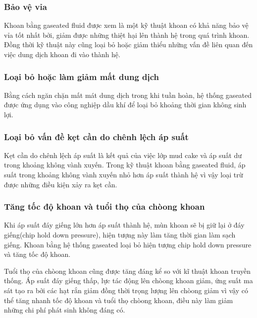 \documentclass[13pt,a4paper]{article}
\begin{document}
	\subsubsection{Bảo vệ vỉa}
	Khoan bằng gaseated fluid được xem là một kỹ thuật khoan có khả năng bảo vệ vỉa tốt nhất bởi, giảm được những thiệt hại lên thành hệ trong quá trình khoan. Đồng thời kỹ thuật này cũng loại bỏ hoặc giảm thiểu những vấn đề liên quan đến việc dung dịch khoan đi vào thành hệ. 
	\subsubsection{Loại bỏ hoặc làm giảm mất dung dịch}
	Bằng cách ngăn chặn mất mát dung dịch trong khi tuần hoàn, hệ thống gaseated được ứng dụng vào công nghiệp dầu khí để loại bỏ khoảng thời gian không sinh lợi.
	\subsubsection{Loại bỏ vấn đề kẹt cần do chênh lệch áp suất}
	Kẹt cần do chênh lệch áp suất là kết quả của việc lớp mud cake và áp suất dư trong khoảng không vành xuyến. Trong kỹ thuật khoan bằng gaseated fluid, áp suất trong khoảng không vành xuyến nhỏ hơn áp suất thành hệ vì vậy loại trừ được những điều kiện xảy ra kẹt cần.
	\subsubsection{Tăng tốc độ khoan và tuổi thọ của chòong khoan}
	Khi áp suất đáy giếng lớn hơn áp suất thành hệ, mùn khoan sẽ bị giữ lại ở đáy giếng(chip hold down pressure), hiện tượng này làm tăng thời gian làm sạch giếng. Khoan bằng hệ thống gaseated loại bỏ hiện tượng chip hold down pressure và tăng tốc độ khoan.\par
	Tuổi thọ của chòong khoan cũng được tăng đáng kể so với kĩ thuật khoan truyền thống. Áp suất đáy giếng thấp, lực tác động lên chòong khoan giảm, ứng suất ma sát tạo ra bởi các hạt rắn giảm đồng thời trọng lượng lên chòong giảm vì vậy có thể tăng nhanh tốc độ khoan và tuổi thọ chòong khoan, điều này làm giảm những chi phí phát sinh không đáng có. 
\end{document}
